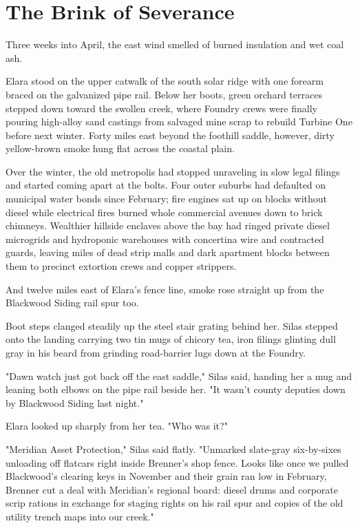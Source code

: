 \chapter{The Brink of Severance}

Three weeks into April, the east wind smelled of burned insulation and wet coal ash.

Elara stood on the upper catwalk of the south solar ridge with one forearm braced on the galvanized pipe rail. Below her boots, green orchard terraces stepped down toward the swollen creek, where Foundry crews were finally pouring high-alloy sand castings from salvaged mine scrap to rebuild Turbine One before next winter. Forty miles east beyond the foothill saddle, however, dirty yellow-brown smoke hung flat across the coastal plain.

Over the winter, the old metropolis had stopped unraveling in slow legal filings and started coming apart at the bolts. Four outer suburbs had defaulted on municipal water bonds since February; fire engines sat up on blocks without diesel while electrical fires burned whole commercial avenues down to brick chimneys. Wealthier hillside enclaves above the bay had ringed private diesel microgrids and hydroponic warehouses with concertina wire and contracted guards, leaving miles of dead strip malls and dark apartment blocks between them to precinct extortion crews and copper strippers.

And twelve miles east of Elara's fence line, smoke rose straight up from the Blackwood Siding rail spur too.

Boot steps clanged steadily up the steel stair grating behind her. Silas stepped onto the landing carrying two tin mugs of chicory tea, iron filings glinting dull gray in his beard from grinding road-barrier lugs down at the Foundry.

"Dawn watch just got back off the east saddle," Silas said, handing her a mug and leaning both elbows on the pipe rail beside her. "It wasn't county deputies down by Blackwood Siding last night."

Elara looked up sharply from her tea. "Who was it?"

"Meridian Asset Protection," Silas said flatly. "Unmarked slate-gray six-by-sixes unloading off flatcars right inside Brenner's shop fence. Looks like once we pulled Blackwood's clearing keys in November and their grain ran low in February, Brenner cut a deal with Meridian's regional board: diesel drums and corporate scrip rations in exchange for staging rights on his rail spur and copies of the old utility trench maps into our creek."

